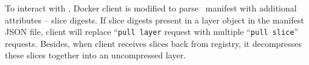 To interact with \sysname, Docker client is modified to 
parse \sysname~manifest with additional attributes -- slice digests.
If slice digests present in a layer object in the manifest JSON file, 
client will replace ``\texttt{pull layer} request with multiple ``\texttt{pull slice}'' requests.
Besides, when client receives slices back from registry, 
it decompresses these slices together into an uncompressed layer.  






